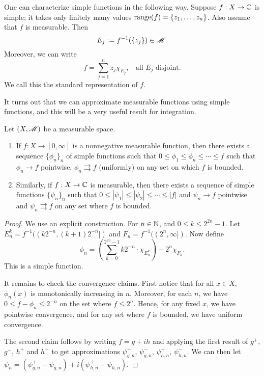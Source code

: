 \documentclass[12pt]{article} %
\begin{document}
\begin{remark}
    One can characterize simple functions in the following way. Suppose $f : X \to \mathbb{C}$ is simple; it takes only finitely many values $\operatorname{range}(f) = \{z_1, \ldots, z_n\}$. Also assume that $f$ is measurable. Then \[E_j := f^{-1}(\{z_j\}) \in \mathscr{M}.\] Moreover, we can write \[f = \sum_{j=1}^n z_j \chi_{E_j}, \ \ \ \ \text{all $E_j$ disjoint}.\] We call this the standard representation of $f$.
\end{remark}

It turns out that we can approximate measurable functions using simple functions, and this will be a very useful result for integration.

\begin{theorem}\label{thm:simple-function-approximation}
    Let $(X, \mathscr{M})$ be a measurable space. \begin{enumerate}
        \item If $f : X \to [0,\infty]$ is a nonnegative measurable function, then there exists a sequence $\{\phi_n\}_n$ of simple functions such that $0 \leq \phi_1 \leq \phi_n \leq \cdots \leq f$ such that $\phi_n \to f$ pointwise, $\phi_n \rightrightarrows f$ (uniformly) on any set on which $f$ is bounded.
        \item Similarly, if $f : X \to \mathbb{C}$ is measurable, then there exists a sequence of simple functions $\{\psi_n\}_n$ such that $0 \leq |\psi_1| \leq |\psi_2| \leq \cdots \leq |f|$ and $\psi_n \to f$ pointwise and $\psi_n \rightrightarrows f$ on any set where $f$ is bounded.
    \end{enumerate}
\end{theorem}

\begin{proof}
    We use an explicit construction. For $n \in \mathbb{N}$, and $0 \leq k \leq 2^{2n} - 1$. Let $E_n^k = f^{-1}((k 2^{-n}, (k+1)2^{-n}])$ and $F_n = f^{-1}((2^n, \infty])$. Now define \[\phi_n = \left(\sum_{k=0}^{2^{2n}-1} k 2^{-n} \cdot \chi_{E_n^k} \right) + 2^n \chi_{F_n}.\] This is a simple function.

    It remains to check the convergence claims. First notice that for all $x \in X$, $\phi_n(x)$ is monotonically increasing in $n$. Moreover, for each $n$, we have $0 \leq f - \phi_n \leq 2^{-n}$ on the set where $f \leq 2^{n}$. Hence, for any fixed $x$, we have pointwise convergence, and for any set where $f$ is bounded, we have uniform convergence.

    The second claim follows by writing $f = g + ih$ and applying the first result of $g^+$, $g^-$, $h^+$ and $h^-$ to get approximations $\psi_{g, n}^+$, $\psi_{g, n}^-$, $\psi_{h, n}^+$, $\psi_{h, n}^-$. We can then let $\psi_n = (\psi_{g, n}^+ - \psi_{g, n}^-) + i(\psi_{h, n}^+ - \psi_{h, n}^-)$.
\end{proof}
\end{document}
